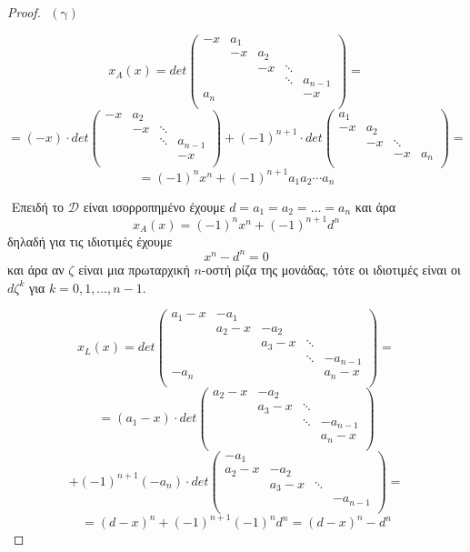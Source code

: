 \documentclass[oneside,a4paper]{article}
\begin{document}
\begin{proof}
$ $\newline
$(\text{γ})$

$$x_A(x) = det \begin{pmatrix}
	-x & a_1 &  &  &  \\
	 & -x & a_2 &  &  \\
	 &  & -x & \ddots &  \\
	 &  &  & \ddots & a_{n-1} \\
	a_n &  &  &  & -x \\
\end{pmatrix}=$$
$$=  (-x) \cdot det \begin{pmatrix}
	 -x & a_2 &  &  \\
	   & -x & \ddots &  \\
	   &  & \ddots & a_{n-1} \\
	   &  &  & -x \\
\end{pmatrix} + (-1)^{n+1} \cdot det \begin{pmatrix}
	a_1 &  &  &  \\
	  - x& a_2 &  &  \\
	  &  -x & \ddots &  \\
	  &  &  -x & a_n \\
\end{pmatrix}  = $$
$$ = (-1)^{n}x^n + (-1)^{n+1} a_1 a_2 \cdots a_n$$

$ $\newline 
Επειδή το $\mathcal{D}$ είναι ισορροπημένο έχουμε $d = a_1 = a_2 = \ldots = a_n$ και άρα $$x_A(x) = (-1)^n x^n + (-1)^{n+1} d^n$$ δηλαδή για τις ιδιοτιμές έχουμε $$x^n - d^n = 0$$
και άρα αν $\zeta$ είναι μια πρωταρχική $n$-οστή ρίζα της μονάδας, τότε οι ιδιοτιμές είναι οι $d\zeta^k$ για $k=0,1,\ldots, n-1$.


$$x_L(x) = det \begin{pmatrix}
	a_1-x & -a_1 &  &  &  \\
	 & a_2 -x & -a_2 &  &  \\
	 &  & a_3 -x & \ddots &  \\
	 &  &  & \ddots & -a_{n-1} \\
	-a_n &  &  &  & a_n -x \\
\end{pmatrix}=$$
$$ = (a_1 - x) \cdot det \begin{pmatrix}
	 a_2 -x & -a_2 &  &  \\
	   & a_3 -x & \ddots &  \\
	   &  & \ddots & -a_{n-1} \\
	  &  &  & a_n -x \\
\end{pmatrix} $$
$$ + (-1)^{n+1} (-a_n) \cdot det\begin{pmatrix}
	 -a_1  & &  &  \\
	 a_2 - x& -a_2 &  &  \\
	   &  a_3 - x& \ddots &  \\
	  &  &   & -a_{n-1} \\
\end{pmatrix} = $$
$$ = (d-x)^n + (-1)^{n+1}(-1)^n d^n = (d-x)^n - d^n$$


\end{proof}
\end{document}
